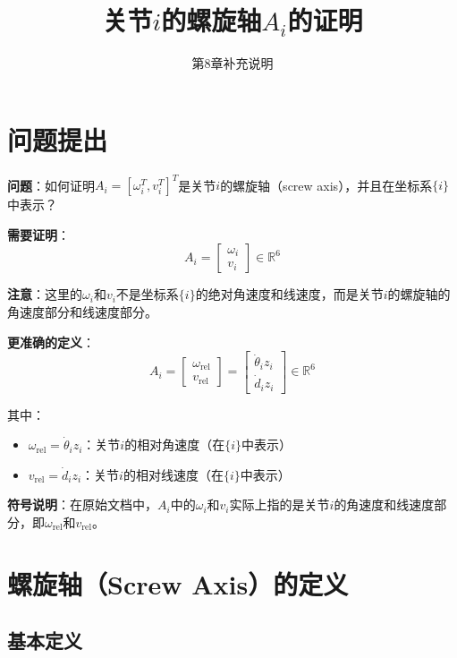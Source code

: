\documentclass[12pt,a4paper]{article}
\title{关节$i$的螺旋轴$A_i$的证明}
\author{第8章补充说明}
\date{}
\begin{document}
\maketitle

\section{问题提出}

\textbf{问题}：如何证明$A_i = [\omega_i^T, v_i^T]^T$是关节$i$的螺旋轴（screw axis），并且在坐标系$\{i\}$中表示？

\textbf{需要证明}：
\begin{equation}
A_i = \begin{bmatrix} \omega_i \\ v_i \end{bmatrix} \in \mathbb{R}^6
\end{equation}

\textbf{注意}：这里的$\omega_i$和$v_i$不是坐标系$\{i\}$的绝对角速度和线速度，而是关节$i$的螺旋轴的角速度部分和线速度部分。

\textbf{更准确的定义}：
\begin{equation}
A_i = \begin{bmatrix} \omega_{\text{rel}} \\ v_{\text{rel}} \end{bmatrix} = \begin{bmatrix} \dot{\theta}_i z_i \\ \dot{d}_i z_i \end{bmatrix} \in \mathbb{R}^6
\end{equation}

其中：
\begin{itemize}
\item $\omega_{\text{rel}} = \dot{\theta}_i z_i$：关节$i$的相对角速度（在$\{i\}$中表示）
\item $v_{\text{rel}} = \dot{d}_i z_i$：关节$i$的相对线速度（在$\{i\}$中表示）
\end{itemize}

\textbf{符号说明}：在原始文档中，$A_i$中的$\omega_i$和$v_i$实际上指的是关节$i$的角速度和线速度部分，即$\omega_{\text{rel}}$和$v_{\text{rel}}$。

\section{螺旋轴（Screw Axis）的定义}

\subsection{基本定义}
\end{document}
